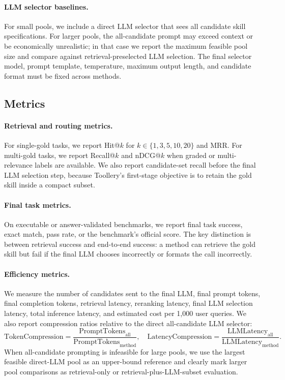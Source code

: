 \paragraph{LLM selector baselines.}
For small pools, we include a direct LLM selector that sees all candidate skill
specifications. For larger pools, the all-candidate prompt may exceed context or
be economically unrealistic; in that case we report the maximum feasible pool
size and compare against retrieval-preselected LLM selection. The final selector
model, prompt template, temperature, maximum output length, and candidate format
must be fixed across methods.

\subsection{Metrics}
\label{subsec:metrics}

\paragraph{Retrieval and routing metrics.}
For single-gold tasks, we report Hit@$k$ for $k \in \{1, 3, 5, 10, 20\}$ and
MRR. For multi-gold tasks, we report Recall@$k$ and nDCG@$k$ when graded or
multi-relevance labels are available. We also report candidate-set recall before
the final LLM selection step, because Toollery's first-stage objective is to
retain the gold skill inside a compact subset.

\paragraph{Final task metrics.}
On executable or answer-validated benchmarks, we report final task success,
exact match, pass rate, or the benchmark's official score. The key distinction is
between retrieval success and end-to-end success: a method can retrieve the gold
skill but fail if the final LLM chooses incorrectly or formats the call
incorrectly.

\paragraph{Efficiency metrics.}
We measure the number of candidates sent to the final LLM, final prompt tokens,
final completion tokens, retrieval latency, reranking latency, final LLM
selection latency, total inference latency, and estimated cost per 1,000 user
queries. We also report compression ratios relative to the direct all-candidate
LLM selector:
\[
\mathrm{TokenCompression}
= \frac{\mathrm{PromptTokens}_{\mathrm{all}}}
{\mathrm{PromptTokens}_{\mathrm{method}}},
\quad
\mathrm{LatencyCompression}
= \frac{\mathrm{LLMLatency}_{\mathrm{all}}}
{\mathrm{LLMLatency}_{\mathrm{method}}}.
\]
When all-candidate prompting is infeasible for large pools, we use the largest
feasible direct-LLM pool as an upper-bound reference and clearly mark larger
pool comparisons as retrieval-only or retrieval-plus-LLM-subset evaluation.

